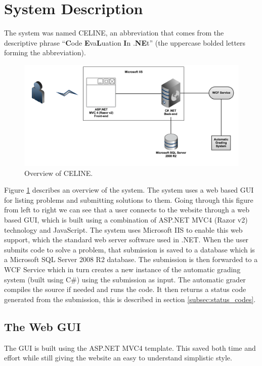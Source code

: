 \section{System Description}
The system was named CELINE, an abbreviation that comes from the descriptive phrase ``\textbf{C}ode \textbf{E}va\textbf{L}uation \textbf{I}n .\textbf{NE}t'' (the uppercase bolded letters forming the abbreviation). 

\begin{figure}[h]
	\centering
	\includegraphics[width=0.9\linewidth]{chapters/media/overview.png}
	\caption{Overview of CELINE.}
	\label{fig:SystemOverview}
\end{figure}

Figure \ref{fig:SystemOverview} describes an overview of the system. The system uses a web based GUI for listing problems and submitting solutions to them. Going through this figure from left to right we can see that a user connects to the website through a web based GUI, which is built using a combination of ASP.NET MVC4 (Razor v2) technology and JavaScript. The system uses Microsoft IIS to enable this web support, which the standard web server software used in .NET. When the user submits code to solve a problem, that submission is saved to a database which is a Microsoft SQL Server 2008 R2 database. The submission is then forwarded to a WCF Service which in turn creates a new instance of the automatic grading system (built using C\#) using the submission as input. The automatic grader compiles the source if needed and runs the code. It then returns a status code generated from the submission, this is described in section \ref{subsec:status_codes}.


\subsection{The Web GUI}
The GUI is built using the ASP.NET MVC4 template. This saved both time and effort while still giving the website an easy to understand simplistic style. 


